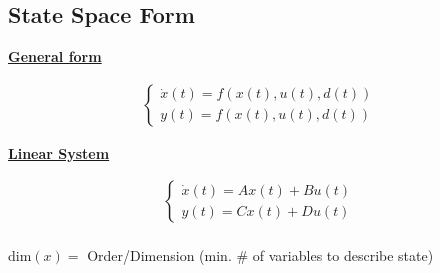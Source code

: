 \subsection{State Space Form}
    \begin{minipage}{0.49 \linewidth}
        \begin{center}
            \textbf{\underline{General form}}
        \end{center}
        \begin{align*}
            \begin{cases}
                \dot{x}(t) = f(x(t), u(t), d(t))\\
                y(t) = f(x(t), u(t), d(t))
            \end{cases}
        \end{align*}
    \end{minipage}
    \begin{minipage}{0.49 \linewidth}
        \begin{center}
            \textbf{\underline{Linear System}}
        \end{center}
        \begin{align*}
            \begin{cases}
                \dot{x}(t) = Ax(t) + Bu(t)\\
                y(t) = Cx(t) + Du(t)
            \end{cases}\\
        \end{align*}
    \end{minipage}
    dim$(x) = $ Order/Dimension (min. $\#$ of variables to describe state)
    
